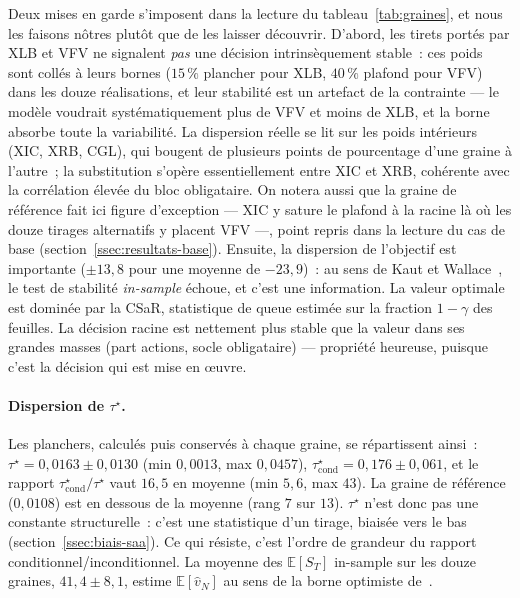 \documentclass[11pt,letterpaper]{article}
\newcommand{\E}{\mathbb{E}}
\newcommand{\taustar}{\tau^{\star}}
\theoremstyle{definition}
\begin{document}
Deux mises en garde s'imposent dans la lecture du tableau~\ref{tab:graines}, et
nous les faisons nôtres plutôt que de les laisser découvrir. D'abord, les tirets
portés par XLB et VFV ne signalent \emph{pas} une décision intrinsèquement
stable~: ces poids sont collés à leurs bornes ($15\,\%$ plancher pour XLB,
$40\,\%$ plafond pour VFV) dans les douze réalisations, et leur stabilité est
un artefact de la contrainte --- le modèle voudrait systématiquement plus de
VFV et moins de XLB, et la borne absorbe toute la variabilité. La dispersion
réelle se lit sur les poids intérieurs (XIC, XRB, CGL), qui bougent de
plusieurs points de pourcentage d'une graine à l'autre~; la substitution
s'opère essentiellement entre XIC et XRB, cohérente avec la corrélation élevée
du bloc obligataire. On notera aussi que la graine de référence fait ici
figure d'exception --- XIC y sature le plafond à la racine là où les douze
tirages alternatifs y placent VFV ---, point repris dans la lecture du cas de
base (section~\ref{ssec:resultats-base}). Ensuite, la dispersion de l'objectif est importante
($\pm 13{,}8$ pour une moyenne de $-23{,}9$)~: au sens de Kaut et
Wallace~\cite{KautWallace2007}, le test de stabilité \emph{in-sample} échoue,
et c'est une information. La valeur optimale est dominée par la CSaR, statistique
de queue estimée sur la fraction $1-\gamma$ des feuilles. La décision racine est
nettement plus stable que la valeur dans ses grandes masses (part actions,
socle obligataire) --- propriété heureuse, puisque c'est la décision qui est
mise en \oe uvre.

\paragraph{Dispersion de $\taustar$.}
Les planchers, calculés puis conservés à chaque graine, se répartissent ainsi~:
$\taustar = 0{,}0163 \pm 0{,}0130$ (min $0{,}0013$, max $0{,}0457$),
$\taustar_{\mathrm{cond}} = 0{,}176 \pm 0{,}061$, et le rapport
$\taustar_{\mathrm{cond}}/\taustar$ vaut $16{,}5$ en moyenne (min $5{,}6$, max
$43$). La graine de référence ($0{,}0108$) est en dessous de la moyenne (rang
$7$ sur $13$). $\taustar$ n'est donc pas une constante structurelle~: c'est une
statistique d'un tirage, biaisée vers le bas
(section~\ref{ssec:biais-saa}). Ce qui résiste, c'est l'ordre de grandeur du
rapport conditionnel/inconditionnel. La moyenne des $\E[S_T]$ in-sample sur les
douze graines, $41{,}4 \pm 8{,}1$, estime $\E[\hat v_N]$ au sens de la borne
optimiste de~\cite{Mak1999}.
\end{document}
